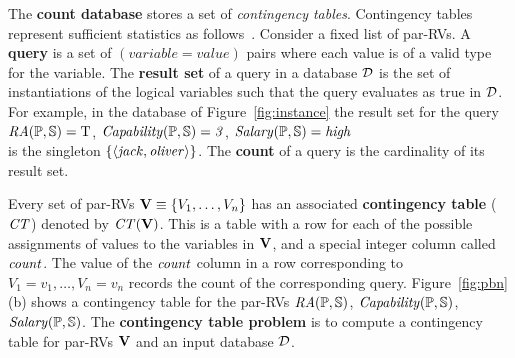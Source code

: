 \documentclass{IEEEtran}
\begin{document}
The \textbf{count database} \CDB stores a set of  {\em contingency tables}. Contingency tables represent sufficient statistics as follows~\cite{Moore1998}. 
Consider a fixed list of par-RVs.
A \textbf{query} is a set of $(variable = value)$ pairs where each value is of a valid type for the variable. 
The \textbf{result set} of a query in a database $\D$ is the set of instantiations of the logical variables such that the query evaluates as true in $\D$.
For example, in the database of Figure~\ref{fig:instance} the result set for the query\\ 
$\it{RA}(\P,\S) = \true$, $\it{Capability}(\P,\S) = 3$, $\it{Salary}(\P,\S) = \it{high} $\\ is
the singleton $\{\langle \it{jack}, \it{oliver}\rangle\}$. 
The \textbf{count} of a query is the cardinality of its result set. 

Every set of par-RVs $\set{V} \equiv \{\V_{1},\ldots,\V_{n} \}$ has an associated \textbf{contingency table} ($\cttable$) denoted by $\cttable(\set{V})$. %
This is a table with a row for each of the possible assignments of values to the variables in $\set{V}$, and a special integer column called $\qcount$. 
The value of the $\qcount$ column in a row 
corresponding to $V_{1} = v_{1},\ldots,V_{n} = v_{n}$ records the count of the 
corresponding query. 
Figure~\ref{fig:pbn}(b) shows a contingency table for the par-RVs $\it{RA}(\P,\S)$, $\it{Capability}(\P,\S)$, $\it{Salary}(\P,\S)$. The \textbf{contingency table problem} is to compute a contingency table for par-RVs $\set{V} $ and an input database $\D$. 
 
\end{document}
